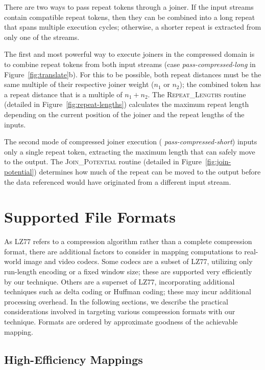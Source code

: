 There are two ways to pass repeat tokens through a joiner.  If the
input streams contain compatible repeat tokens, then they can be
combined into a long repeat that spans multiple execution cycles;
otherwise, a shorter repeat is extracted from only one of the streams.

The first and most powerful way to execute joiners in the compressed
domain is to combine repeat tokens from both input streams (case {\it
  pass-compressed-long} in Figure~\ref{fig:translate}b).  For this to
be possible, both repeat distances must be the same multiple of their
respective joiner weight ($n_1$ or $n_2$); the combined token has a
repeat distance that is a multiple of $n_1 + n_2$.  The
\textsc{Repeat\_Lengths} routine (detailed in
Figure~\ref{fig:repeat-lengths}) calculates the maximum repeat length
depending on the current position of the joiner and the repeat lengths
of the inputs.

The second mode of compressed joiner execution ({\it
  pass-compressed-short}) inputs only a single repeat token,
extracting the maximum length that can safely move to the output.  The
\textsc{Join\_Potential} routine (detailed in
Figure~\ref{fig:join-potential}) determines how much of the repeat can
be moved to the output before the data referenced would have
originated from a different input stream.

\section{Supported File Formats}
\label{sec:formats}

As LZ77 refers to a compression algorithm rather than a complete
compression format, there are additional factors to consider in
mapping computations to real-world image and video codecs.  Some
codecs are a subset of LZ77, utilizing only run-length encoding or a
fixed window size; these are supported very efficiently by our
technique.  Others are a superset of LZ77, incorporating additional
techniques such as delta coding or Huffman coding; these may incur
additional processing overhead.  In the following sections, we
describe the practical considerations involved in targeting various
compression formats with our technique.  Formats are ordered by
approximate goodness of the achievable mapping.

\subsection{High-Efficiency Mappings}
\label{sec:formats-good}


